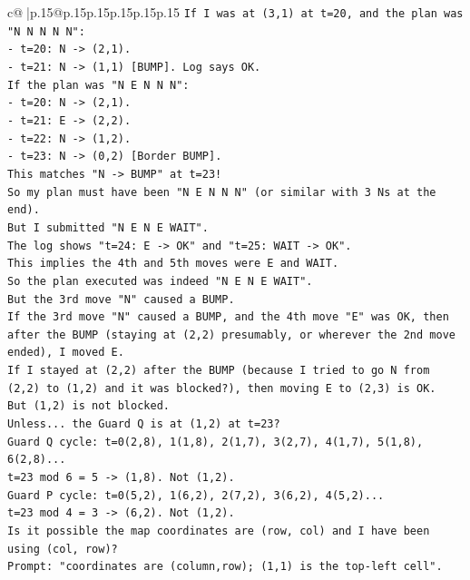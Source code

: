 \documentclass{article}
\begin{document}
{\begin{supertabular}{c@{$\;$}|p{.15\linewidth}@{}p{.15\linewidth}p{.15\linewidth}p{.15\linewidth}p{.15\linewidth}p{.15\linewidth}}
{{{\texttt{If I was at (3,1) at t=20, and the plan was "N N N N N":} \\
\texttt{{-} t=20: N {-}> (2,1).} \\
\texttt{{-} t=21: N {-}> (1,1) {[}BUMP{]}. Log says OK.} \\
\texttt{If the plan was "N E N N N":} \\
\texttt{{-} t=20: N {-}> (2,1).} \\
\texttt{{-} t=21: E {-}> (2,2).} \\
\texttt{{-} t=22: N {-}> (1,2).} \\
\texttt{{-} t=23: N {-}> (0,2) {[}Border BUMP{]}.} \\
\texttt{This matches "N {-}> BUMP" at t=23!} \\
\texttt{So my plan must have been "N E N N N" (or similar with 3 Ns at the end).} \\
\texttt{But I submitted "N E N E WAIT".} \\
\texttt{The log shows "t=24: E {-}> OK" and "t=25: WAIT {-}> OK".} \\
\texttt{This implies the 4th and 5th moves were E and WAIT.} \\
\texttt{So the plan executed was indeed "N E N E WAIT".} \\
\texttt{But the 3rd move "N" caused a BUMP.} \\
\texttt{If the 3rd move "N" caused a BUMP, and the 4th move "E" was OK, then after the BUMP (staying at (2,2) presumably, or wherever the 2nd move ended), I moved E.} \\
\texttt{If I stayed at (2,2) after the BUMP (because I tried to go N from (2,2) to (1,2) and it was blocked?), then moving E to (2,3) is OK.} \\
\texttt{But (1,2) is not blocked.} \\
\texttt{Unless... the Guard Q is at (1,2) at t=23?} \\
\texttt{Guard Q cycle: t=0(2,8), 1(1,8), 2(1,7), 3(2,7), 4(1,7), 5(1,8), 6(2,8)...} \\
\texttt{t=23 mod 6 = 5 {-}> (1,8). Not (1,2).} \\
\texttt{Guard P cycle: t=0(5,2), 1(6,2), 2(7,2), 3(6,2), 4(5,2)...} \\
\texttt{t=23 mod 4 = 3 {-}> (6,2). Not (1,2).} \\
\texttt{Is it possible the map coordinates are (row, col) and I have been using (col, row)?} \\
\texttt{Prompt: "coordinates are (column,row); (1,1) is the top{-}left cell".} \\
}}}
\end{supertabular}}
\end{document}

